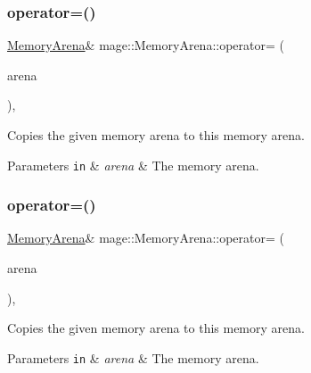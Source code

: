 \subsubsection{\texorpdfstring{operator=()}{operator=()}\hspace{0.1cm}{\footnotesize\ttfamily [1/2]}}
{\footnotesize\ttfamily \hyperlink{classmage_1_1_memory_arena}{Memory\+Arena}\& mage\+::\+Memory\+Arena\+::operator= (\begin{DoxyParamCaption}\item[{const \hyperlink{classmage_1_1_memory_arena}{Memory\+Arena} \&}]{arena }\end{DoxyParamCaption})\hspace{0.3cm}{\ttfamily [private]}, {\ttfamily [delete]}}

Copies the given memory arena to this memory arena.


\begin{DoxyParams}[1]{Parameters}
\mbox{\tt in}  & {\em arena} & The memory arena. \\
\hline
\end{DoxyParams}
\hypertarget{classmage_1_1_memory_arena_aa4b80a917a838a1ca3788f906723d273}{}\label{classmage_1_1_memory_arena_aa4b80a917a838a1ca3788f906723d273} 
\subsubsection{\texorpdfstring{operator=()}{operator=()}\hspace{0.1cm}{\footnotesize\ttfamily [2/2]}}
{\footnotesize\ttfamily \hyperlink{classmage_1_1_memory_arena}{Memory\+Arena}\& mage\+::\+Memory\+Arena\+::operator= (\begin{DoxyParamCaption}\item[{\hyperlink{classmage_1_1_memory_arena}{Memory\+Arena} \&\&}]{arena }\end{DoxyParamCaption})\hspace{0.3cm}{\ttfamily [private]}, {\ttfamily [delete]}}

Copies the given memory arena to this memory arena.


\begin{DoxyParams}[1]{Parameters}
\mbox{\tt in}  & {\em arena} & The memory arena. \\
\hline
\end{DoxyParams}
\hypertarget{classmage_1_1_memory_arena_a117b74c7bd5dfb28dfdaae6cab253491}{}\label{classmage_1_1_memory_arena_a117b74c7bd5dfb28dfdaae6cab253491} 
